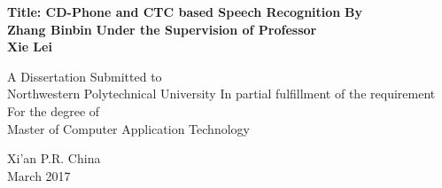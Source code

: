 \newpage
\thispagestyle{empty}
\begin{center}
\vspace*{22pt}
\fontsize{22pt}{26pt}\selectfont
\textbf{Title: CD-Phone and CTC based Speech Recognition}
\vskip 2cm
\fontsize{15pt}{17pt}\selectfont
\textbf{By\\Zhang Binbin}
\vskip 0.5cm
\textbf{Under the Supervision of Professor\\Xie Lei}

\vskip 2cm
\fontsize{16pt}{18pt}\selectfont
A Dissertation Submitted to\\ Northwestern Polytechnical University
\vskip 0.5cm
In partial fulfillment of the requirement\\ For the degree of\\
Master of Computer Application Technology

\vskip 3cm
\fontsize{15pt}{17pt}\selectfont
Xi'an P.R. China\\March 2017
\vfill
\end{center}

\song \normalsize

